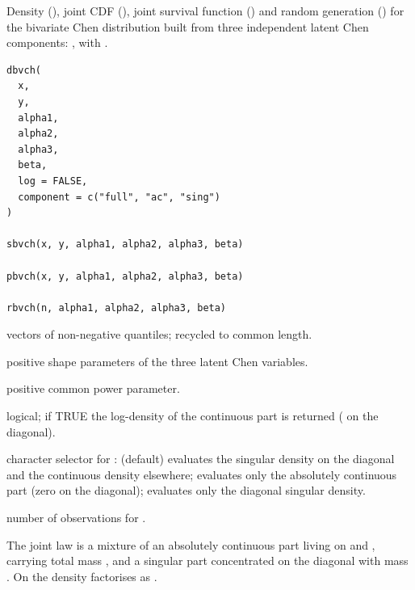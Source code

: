 \documentclass[11pt,a4paper]{article}
\begin{document}
%
\begin{Description}
Density (), joint CDF (),
joint survival function () and random generation
() for the bivariate Chen distribution built from
three independent latent Chen components: ,
 with .
\end{Description}
%
\begin{Usage}
\begin{verbatim}
dbvch(
  x,
  y,
  alpha1,
  alpha2,
  alpha3,
  beta,
  log = FALSE,
  component = c("full", "ac", "sing")
)

sbvch(x, y, alpha1, alpha2, alpha3, beta)

pbvch(x, y, alpha1, alpha2, alpha3, beta)

rbvch(n, alpha1, alpha2, alpha3, beta)
\end{verbatim}
\end{Usage}
%
\begin{Arguments}
\begin{ldescription}
\item[\code{x}, \code{y}] vectors of non-negative quantiles; recycled to common length.

\item[\code{alpha1}, \code{alpha2}, \code{alpha3}] positive shape parameters of the three
latent Chen variables.

\item[\code{beta}] positive common power parameter.

\item[\code{log}] logical; if TRUE the log-density of the continuous part
is returned ( on the diagonal).

\item[\code{component}] character selector for : 
(default) evaluates the singular density on the diagonal and the
continuous density elsewhere;  evaluates only the
absolutely continuous part (zero on the diagonal); 
evaluates only the diagonal singular density.

\item[\code{n}] number of observations for .
\end{ldescription}
\end{Arguments}
%
\begin{Details}
The joint law is a mixture of an absolutely continuous
part living on  and , carrying
total mass ,
and a singular part concentrated on the diagonal 
with mass .  On
 the density factorises as
.
\end{Details}
\end{document}
